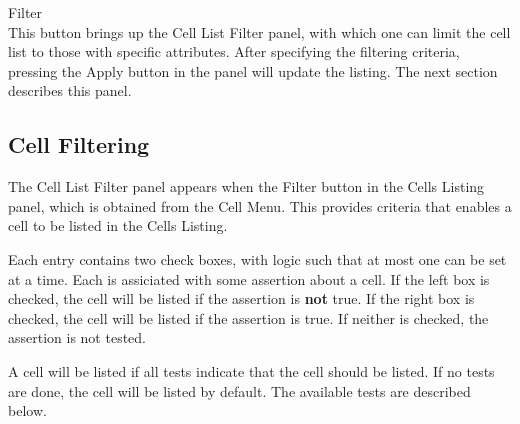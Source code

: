\begin{description}
\item{\cb Filter}\\
This button brings up the {\cb Cell List Filter} panel, with which one
can limit the cell list to those with specific attributes.  After
specifying the filtering criteria, pressing the {\cb Apply} button in
the panel will update the listing.  The next section describes this
panel.
\end{description}

\subsection{Cell Filtering}
\label{cellfilt}

The {\cb Cell List Filter} panel appears when the {\cb Filter} button
in the {\cb Cells Listing} panel, which is obtained from the {\cb Cell
Menu}.  This provides criteria that enables a cell to be listed in the
{\cb Cells Listing}.

Each entry contains two check boxes, with logic such that at most one
can be set at a time.  Each is assiciated with some assertion about a
cell.  If the left box is checked, the cell will be listed if the
assertion is {\bf not} true.  If the right box is checked, the cell
will be listed if the assertion is true.  If neither is checked, the
assertion is not tested.

A cell will be listed if all tests indicate that the cell should be
listed.  If no tests are done, the cell will be listed by default. 
The available tests are described below.

